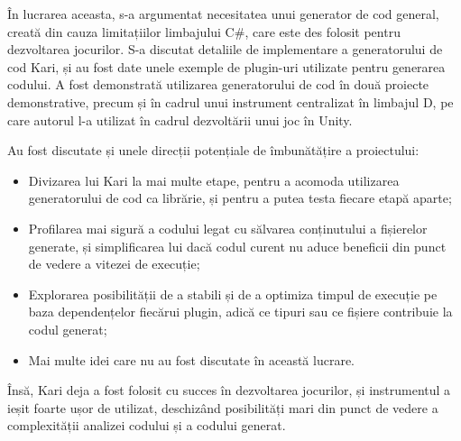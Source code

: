 \documentclass[a4paper,12pt]{report}
\begin{document}
În lucrarea aceasta, s-a argumentat necesitatea unui generator de cod general, creată din cauza limitațiilor limbajului C\#, care este des folosit pentru dezvoltarea jocurilor.
S-a discutat detaliile de implementare a generatorului de cod Kari, și au fost date unele exemple de plugin-uri utilizate pentru generarea codului.
A fost demonstrată utilizarea generatorului de cod în două proiecte demonstrative, precum și în cadrul unui instrument centralizat în limbajul D, pe care autorul l-a utilizat în cadrul dezvoltării unui joc în Unity. 


Au fost discutate și unele direcții potențiale de îmbunătățire a proiectului:

\begin{itemize}
  \item Divizarea lui Kari la mai multe etape, pentru a acomoda utilizarea generatorului de cod ca librărie, și pentru a putea testa fiecare etapă aparte;
  \item Profilarea mai sigură a codului legat cu sălvarea conținutului a fișierelor generate, și simplificarea lui dacă codul curent nu aduce beneficii din punct de vedere a vitezei de execuție;
  \item Explorarea posibilității de a stabili și de a optimiza timpul de execuție pe baza dependențelor fiecărui plugin, adică ce tipuri sau ce fișiere contribuie la codul generat;
  \item Mai multe idei care nu au fost discutate în această lucrare.
\end{itemize}

Însă, Kari deja a fost folosit cu succes în dezvoltarea jocurilor, și instrumentul a ieșit foarte ușor de utilizat, deschizând posibilități mari din punct de vedere a complexității analizei codului și a codului generat.





\appendix
\renewcommand{\thechapter}{\arabic{chapter}} 

\end{document}
